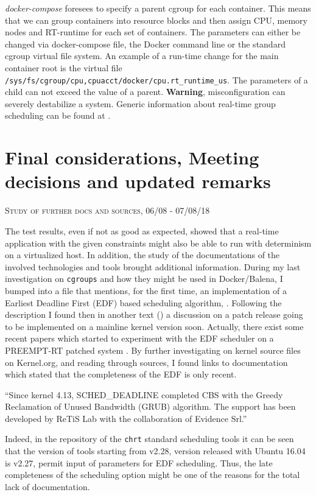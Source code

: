 \documentclass[]{scrartcl}
\begin{document}
\textit{docker-compose} foresees to specify a parent cgroup for each container. This means that we can group containers into resource blocks and then assign CPU, memory nodes and RT-runtime for each set of containers.
The parameters can either be changed via docker-compose file, the Docker command line or the standard cgroup virtual file system. An example of a run-time change for the main container root is the virtual file \texttt{/sys/fs/cgroup/cpu,cpuacct/docker/cpu.rt\_runtime\_us}.
The parameters of a child can not exceed the value of a parent. \textbf{Warning}, misconfiguration can severely destabilize a system. Generic information about real-time group scheduling can be found at \cite{kernel01}.

\section{Final considerations, Meeting decisions and updated remarks}

{\small\textsc{Study of further docs and sources, 06/08 - 07/08/18} \bigskip}

The test results, even if not as good as expected, showed that a real-time application with the given constraints might also be able to run with determinism on a virtualized host.
In addition, the study of the documentations of the involved technologies and tools brought additional information.
During my last investigation on \texttt{cgroups} and how they might be used in Docker/Balena, I bumped into a file that mentions, for the first time, an implementation of a Earliest Deadline First (EDF) based scheduling algorithm, \cite{kernel01}.
Following the description I found then in another text
(\cite{kernel02}) a discussion on a patch release going to be implemented on a mainline kernel version soon. Actually, there exist some recent papers which started to experiment with the EDF scheduler on a PREEMPT-RT patched system \cite{Buelnaetal2017}.
By further investigating on kernel source files on Kernel.org, and reading through sources, I found links to documentation \cite{wiki01} which stated that the completeness of the EDF is only recent.
\bigskip

``Since kernel 4.13, SCHED\_DEADLINE completed CBS with the Greedy Reclamation of Unused Bandwidth (GRUB) algorithm. The support has been developed by ReTiS Lab with the collaboration of Evidence Srl.''
\bigskip

Indeed, in the repository of the \texttt{chrt} standard scheduling tools \cite{schtools01} it can be seen that the version of tools starting from v2.28, version released with Ubuntu 16.04 is v2.27, permit input of  parameters for EDF scheduling.
Thus, the late completeness of the scheduling option might be one of the reasons for the total lack of documentation.
\end{document}

